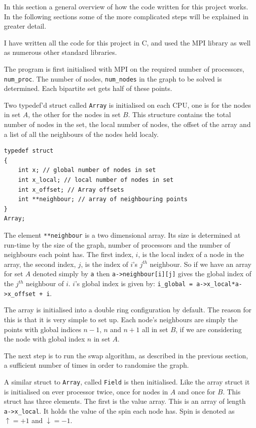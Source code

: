 \documentclass[pdftex,12pt,a4paper]{article}
\begin{document}
In this section a general overview of how the code written for this project works. In the following sections some of the more complicated steps will be explained in greater detail.

I have written all the code for this project in C, and used the MPI library as well as numerous other standard libraries.

The program is first initialised with MPI on the required number of processors, \verb|num_proc|. The number of nodes, \verb|num_nodes| in the graph to be solved is determined. Each bipartite set gets half of these points.

Two typedef'd struct called \verb|Array| is initialised on each CPU, one is for the nodes in set $A$, the other for the nodes in set $B$. This structure contains the total number of nodes in the set, the local number of nodes, the offset of the array and a list of all the neighbours of the nodes held localy.

\begin{lstlisting}
typedef struct
{
	int x; // global number of nodes in set
	int x_local; // local number of nodes in set
	int x_offset; // Array offsets
	int **neighbour; // array of neighbouring points
}
Array;
\end{lstlisting}

The element \verb|**neighbour| is a two dimensional array. Its size is determined at run-time by the size of the graph, number of processors and the number of neighbours each point has. The first index, $i$, is the local index of a node in the array, the second index, $j$, is the index of $i$'s $j^{th}$ neighbour. So if we have an array for set $A$ denoted simply by \verb|a| then \verb|a->neighbour[i][j]| gives the global index of the $j^{th}$ neighbour of $i$. $i$'s global index is given by: \verb|i_global = a->x_local*a->x_offset + i|.

The array is initialised into a double ring configuration by default. The reason for this is that it is very simple to set up. Each node's neighbours are simply the points with global indices $n-1$, $n$ and $n+1$ all in set $B$, if we are considering the node with global index $n$ in set $A$.


The next step is to run the swap algorithm, as described in the previous section, a sufficient number of times in order to randomise the graph.

A similar struct to \verb|Array|, called \verb|Field| is then initialised. Like the array struct it is initialised on ever processor twice, once for nodes in $A$ and once for $B$. This struct has three elements. The first is the value array. This is an array of length \verb|a->x_local|. It holds the value of the spin each node has. Spin is denoted as $\uparrow = +1$ and $\downarrow = -1$.
\end{document}
